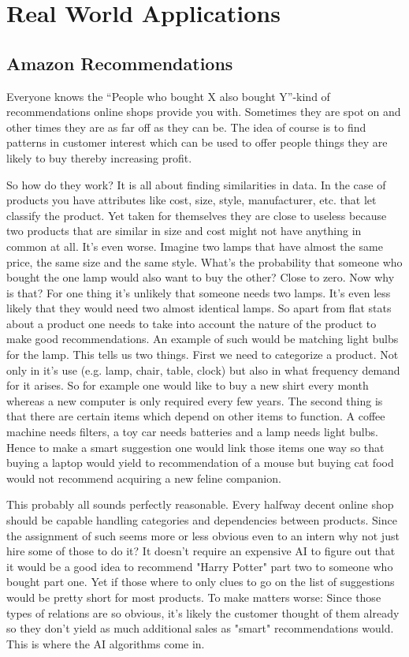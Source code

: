\newpage
\section{Real World Applications}

\subsection{Amazon Recommendations}
Everyone knows the ``People who bought X also bought Y''-kind of recommendations online shops provide you with. Sometimes they are spot on and other times they are as far off as they can be. The idea of course is to find patterns in customer interest which can be used to offer people things they are likely to buy thereby increasing profit.

So how do they work? It is all about finding similarities in data. In the case of products you have attributes like cost, size, style, manufacturer, etc. that let classify the product. Yet taken for themselves they are close to useless because two products that are similar in size and cost might not have anything in common at all. It's even worse. Imagine two lamps that have almost the same price, the same size and the same style. What's the probability that someone who bought the one lamp would also want to buy the other? Close to zero. Now why is that? For one thing it's unlikely that someone needs two lamps. It's even less likely that they would need two almost identical lamps. So apart from flat stats about a product one needs to take into account the nature of the product to make good recommendations. An example of such would be matching light bulbs for the lamp. 
This tells us two things. First we need to categorize a product. Not only in it's use (e.g. lamp, chair, table, clock) but also in what frequency demand for it arises. So for example one would like to buy a new shirt every month whereas a new computer is only required every few years. The second thing is that there are certain items which depend on other items to function. A coffee machine needs filters, a toy car needs batteries and a lamp needs light bulbs. Hence to make a smart suggestion one would link those items one way so that buying a laptop would yield to recommendation of a mouse but buying cat food would not recommend acquiring a new feline companion.

This probably all sounds perfectly reasonable. Every halfway decent online shop should be capable handling categories and dependencies between products. Since the assignment of such seems more or less obvious even to an intern why not just hire some of those to do it? It doesn't require an expensive AI to figure out that it would be a good idea to recommend "Harry Potter" part two to someone who bought part one. Yet if those where to only clues to go on the list of suggestions would be pretty short for most products. To make matters worse: Since those types of relations are so obvious, it's likely the customer thought of them already so they don't yield as much additional sales as "smart" recommendations would. This is where the AI algorithms come in.

